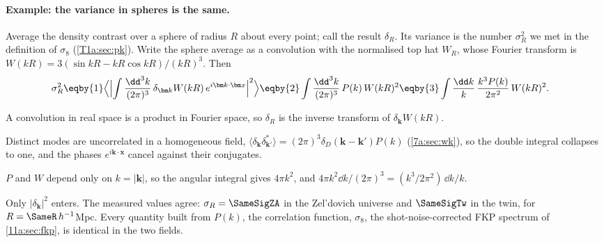 \paragraph{Example: the variance in spheres is the same.}
Average the density contrast over a sphere of radius $R$ about every point; call
the result $\delta_R$. Its variance is the number $\sigma_R^2$ we met in the
definition of $\sigma_8$ (\cref{T1a:sec:pk}). Write the sphere average as a
convolution with the normalised top hat $W_R$, whose Fourier transform is
$W(kR)=3(\sin kR-kR\cos kR)/(kR)^3$. Then
\begin{align}
  \sigma_R^2
  &\eqby{1}\Bigl\langle\Bigl|\int\frac{\dd^3k}{(2\pi)^3}\,
     \delta_{\bm k}W(kR)\,e^{i\bm k\cdot\bm x}\Bigr|^2\Bigr\rangle
   \eqby{2}\int\frac{\dd^3k}{(2\pi)^3}\,P(k)\,W(kR)^2
   \eqby{3}\int\frac{\dd k}{k}\,\frac{k^3P(k)}{2\pi^2}\,W(kR)^2 .
  \label{11b:eq:sigmaR}
\end{align}
\begin{explain}
  \item A convolution in real space is a product in Fourier space, so $\delta_R$
        is the inverse transform of $\delta_{\bm k}W(kR)$.
  \item Distinct modes are uncorrelated in a homogeneous field,
        $\langle\delta_{\bm k}\delta^*_{\bm k'}\rangle=(2\pi)^3\delta_D(\bm k-\bm k')P(k)$
        (\cref{7a:sec:wk}), so the double integral collapses to one, and the
        phases $e^{i\bm k\cdot\bm x}$ cancel against their conjugates.
  \item $P$ and $W$ depend only on $k=|\bm k|$, so the angular integral gives
        $4\pi k^2$, and $4\pi k^2\dd k/(2\pi)^3=(k^3/2\pi^2)\,\dd k/k$.
\end{explain}
Only $|\delta_{\bm k}|^2$ enters. The measured values agree: $\sigma_R=\SameSigZA$
in the Zel'dovich universe and $\SameSigTw$ in the twin, for
$R=\SameR\,h^{-1}$Mpc. Every quantity built from $P(k)$, the correlation
function, $\sigma_8$, the shot-noise-corrected FKP spectrum of \cref{11a:sec:fkp},
is identical in the two fields.

